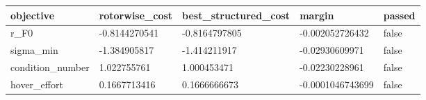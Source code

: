 \begin{tabular}{@{}lllll@{}}
\toprule
objective & rotorwise\_cost & best\_structured\_cost & margin & passed \\
\midrule
r\_F0 & -0.8144270541 & -0.8164797805 & -0.002052726432 & false \\
sigma\_min & -1.384905817 & -1.414211917 & -0.02930609971 & false \\
condition\_number & 1.022755761 & 1.000453471 & -0.02230228961 & false \\
hover\_effort & 0.1667713416 & 0.1666666673 & -0.0001046743699 & false \\
\bottomrule
\end{tabular}

